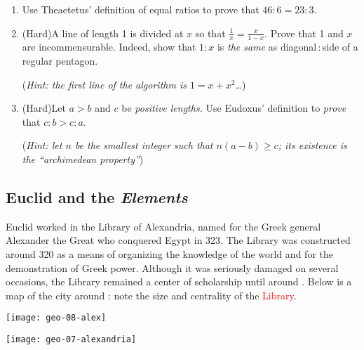 \begin{exercises}{}{}
\begin{enumerate}
	  
	  \item%
		Use Theaetetus' definition of equal ratios to prove that $46:6=23:3$.
	  
	  
	  \item%
	  (Hard)\lstsp A line of length 1 is divided at $x$ so that $\frac 1x=\frac x{1-x}$. Prove that 1 and $x$ are incommensurable. Indeed, show that $1:x$ is \emph{the same} as diagonal\,:\,side of a regular pentagon.\par
	  (\emph{Hint: the first line of the algorithm is $1=x+x^2$\ldots})
	  
	  
	  \item%
	  (Hard)\lstsp Let $a>b$ and $c$ be \emph{positive lengths.} Use Eudoxus' definition to \emph{prove} that $c:b>c:a$.\par
	  (\emph{Hint: let $n$ be the smallest integer such that $n(a-b)\ge c$; its existence is the ``archimedean property''})
	\end{enumerate}
\end{exercises}


\clearpage



\subsection{Euclid and the \emph{Elements}}

\begin{minipage}[t]{0.70\linewidth}\vspace{-8pt}
	Euclid worked in the Library of Alexandria, named for the Greek general Alexander the Great who conquered Egypt in 323\BC. The Library was constructed around 320\BC{} as a means of organizing the knowledge of the world and for the demonstration of Greek power. Although it was seriously damaged on several occasions, the Library remained a center of scholarship until around . Below is a map of the city around : note the size and centrality of the \textcolor{red}{Library}.
\end{minipage}
\hfill
\begin{minipage}[t]{0.29\linewidth}\vspace{-25pt}
	\flushright
	\texttt{[image: geo-08-alex]}
\end{minipage}\par

\begin{center}
	\texttt{[image: geo-07-alexandria]}
\end{center}

